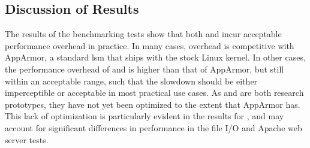 

\subsection{Discussion of Results}%
\label{ss:eval-performance-discussion}

The results of the benchmarking tests show that both \bpfbox{} and \bpfcontain{} incur
acceptable performance overhead in practice. In many cases, overhead is competitive with
AppArmor, a standard \gls{lsm} that ships with the stock Linux kernel. In other cases, the
performance overhead of \bpfbox{} and \bpfcontain{} is higher than that of AppArmor, but
still within an acceptable range, such that the slowdown should be either imperceptible or
acceptable in most practical use cases.  As \bpfbox{} and \bpfcontain{} are both research
prototypes, they have not yet been optimized to the extent that AppArmor has. This lack of
optimization is particularly evident in the results for \bpfcontain{}, and may account for
significant differences in performance in the file I/O and Apache web server tests.

